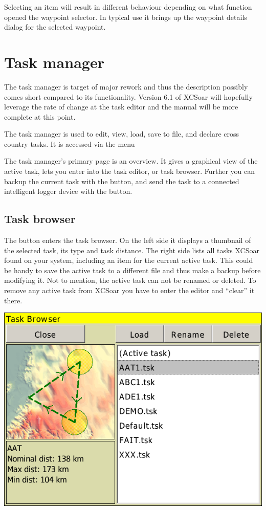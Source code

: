\documentclass[a4paper,12pt]{refrep}
\begin{document}
Selecting an item will result in different behaviour
depending on what function opened the waypoint selector.  In typical
use it brings up the waypoint details dialog for the selected
waypoint.

\section{Task manager}\label{sec:task-manager-dialog}
\begin{it}The task manager is target of major rework and thus the description
possibly comes short compared to its functionality. Version 6.1 of XCSoar will hopefully
leverage the rate of change at the task editor and the manual will be more
complete at this point.\end{it}

The task manager is used to edit, view, load, save to file, and declare cross
country tasks. It is accessed via the menu
\begin{quote}
\blink{}\blink{}
\end{quote} 

The task manager's primary page is an overview. It gives a graphical
view of the active task, lets you enter into the task editor, or task browser.
Further you can backup the current task with the  button, and 
send the task to a connected intelligent logger device with the 
button.

\subsection*{Task browser}
The  button enters the task browser. On the left side it displays a thumbnail of
the selected task, its type and task distance.  The right side lists all
tasks XCSoar found on your system, including an item for the current active
task. This could be handy to save the active task to a different file and thus
make a backup before modifying it.  Not to mention, the active task can not be
renamed or deleted. To remove any active task from XCSoar you have to enter the
editor and ``clear'' it there.

\begin{center}
\includegraphics[angle=0,width=0.8\linewidth,keepaspectratio='true']{figures/dialog-taskbrowser.png}
\end{center}
\end{document}
